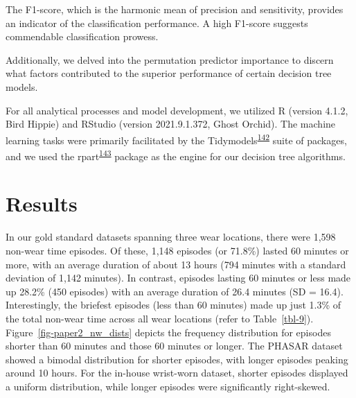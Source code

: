 \documentclass[
  10pt,
]{scrbook}
\begin{document}
The F1-score, which is the harmonic mean of precision and sensitivity,
provides an indicator of the classification performance. A high F1-score
suggests commendable classification prowess.

Additionally, we delved into the permutation predictor importance to
discern what factors contributed to the superior performance of certain
decision tree models.

For all analytical processes and model development, we utilized R
(version 4.1.2, Bird Hippie) and RStudio (version 2021.9.1.372, Ghost
Orchid). The machine learning tasks were primarily facilitated by the
Tidymodels\textsuperscript{\protect\hyperlink{ref-kuhn_tidymodels_2020}{142}}
suite of packages, and we used the
rpart\textsuperscript{\protect\hyperlink{ref-rpart}{143}} package as the
engine for our decision tree algorithms.

\hypertarget{results-1}{%
\section{Results}\label{results-1}}

In our gold standard datasets spanning three wear locations, there were
1,598 non-wear time episodes. Of these, 1,148 episodes (or 71.8\%)
lasted 60 minutes or more, with an average duration of about 13 hours
(794 minutes with a standard deviation of 1,142 minutes). In contrast,
episodes lasting 60 minutes or less made up 28.2\% (450 episodes) with
an average duration of 26.4 minutes (SD = 16.4). Interestingly, the
briefest episodes (less than 60 minutes) made up just 1.3\% of the total
non-wear time across all wear locations (refer to Table~\ref{tbl-9}).
Figure~\ref{fig-paper2_nw_dists} depicts the frequency distribution for
episodes shorter than 60 minutes and those 60 minutes or longer. The
PHASAR dataset showed a bimodal distribution for shorter episodes, with
longer episodes peaking around 10 hours. For the in-house wrist-worn
dataset, shorter episodes displayed a uniform distribution, while longer
episodes were significantly right-skewed.

\begingroup

\footnotesize
\end{document}
